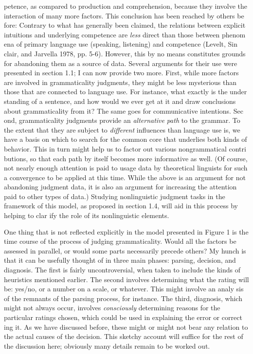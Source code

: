 \clearpage\setcounter{page}{1}\begin{styleTextbody}
petence, as compared to production and comprehension, because they involve the interaction of many more factors. This conclusion has been reached by others be\- fore: {\textquotedbl}Contrary to what has generally been claimed, the relations between explicit intuitions and underlying competence are \textit{less}\textit{ }direct than those between phenom\- ena of primary language use (speaking, listening) and competence{\textquotedbl} (Levelt, Sin\- clair, and Jarvella 1978, pp. 5-6). However, this by no means constitutes grounds for abandoning them as a source of data. Several arguments for their use were presented in section 1.1; I can now provide two more. First, while more factors are involved in grammaticality judgments, they might be less mysterious than those that are connected to language use. For instance, what exactly is the under\- standing of a sentence, and how would we ever get at it and draw conclusions about grammaticality from it? The same goes for communicative intentions. Sec\- ond, grammaticality judgments provide an \textit{alternative}\textit{ }\textit{path}\textit{ }to the grammar. To the extent that they are subject to \textit{different}\textit{ }influences than language use is, we have a basis on which to search for the common core that underlies both kinds of behavior. This in turn might help us to factor out various nongrammatical contri\- butions, so that each path by itself becomes more informative as well. (Of course, not nearly enough attention is paid to usage data by theoretical linguists for such a convergence to be applied at this time. While the above is an argument for not abandoning judgment data, it is also an argument for increasing the attention paid to other types of data.) Studying nonlinguistic judgment tasks in the framework of this model, as proposed in section 1.4, will aid in this process by helping to clar\- ify the role of its nonlinguistic elements.
\end{styleTextbody}


\begin{styleTextbody}
One thing that is not reflected explicitly in the model presented in Figure 1 is the time course of the process of judging grammaticality. Would all the factors be assessed in parallel, or would some parts necessarily precede others? My hunch is that it can be usefully thought of in three main phases: parsing, decision, and diagnosis. The first is fairly uncontroversial, when taken to include the kinds of heuristics mentioned earlier. The second involves determining what the rating will be: yes/no, or a number on a scale, or whatever. This might involve an analy\- sis of the remnants of the parsing process, for instance. The third, diagnosis, which might not always occur, involves \textit{consciously}\textit{ }determining reasons for the particular ratings chosen, which could be used in explaining the error or correct\- ing it. As we have discussed before, these might or might not bear any relation to the actual causes of the decision. This sketchy account will suffice for the rest of the discussion here; obviously many details remain to be worked out.
\end{styleTextbody}


